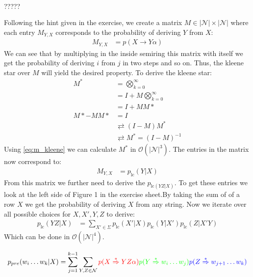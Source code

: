 \documentclass[a4paper,12pt]{ETHexercise}
\begin{document}
\begin{question}
\begin{subquestion}
\begin{align}
		\end{align}
		?????
	\end{subquestion}
	\begin{subquestion}
		Following the hint given in the exercise, we create a matrix $M \in |\mathcal{N}| \times |\mathcal{N}|$ where each entry $M_{Y,X}$ corresponds to the probability of deriving $Y$ from $X$:
		\begin{align}
			M_{Y,X} & = p(X \rightarrow Y\alpha)
		\end{align}
		We can see that by multiplying in the inside semiring this matrix with itself we get the probability of deriving $i$ from $j$ in two steps and so on. Thus, the kleene star over $M$ will yield the desired property. To derive the kleene star:
		\begin{align}
			M^*       & =\bigotimes_{k=0}^{\infty}                              \\
			          & =I + M \bigotimes_{k=0}^{\infty}                        \\
			          & = I + MM*                                               \\
			M*  - MM* & =I                                                      \\
			          & \rightleftarrows (I- M)M^*                              \\
			          & \rightleftarrows M^* = (I - M)^{-1} \label{eq:m_kleene}
		\end{align}
		Using \cref{eq:m_kleene} we can calculate $M^*$ in $\mathcal{O}(|\mathcal{N}|^3)$. The entries in the matrix now correspond to:
		\begin{align}
			M_{Y,X} & = p_{\text{lc}}(Y | X)
		\end{align}
		From this matrix we further need to derive the $p_{\text{lc}(YZ | X)}$. To get these entries we look at the left side of Figure 1 in the exercise sheet.By taking the sum of of a row $X$ we get the probability of deriving $X$ from any string. Now we iterate over all possible choices for $X, X',Y,Z$ to derive:
		\begin{align}
			p_{\text{lc}}(YZ | X) & = \sum_{X' \in \Sigma} p_{\text{lc}}(X' | X) p_{\text{lc}}(Y | X') p_{\text{lc}}(Z | X'Y) \label{eq:lc}
		\end{align}
		Which can be done in $\mathcal{O}(|\mathcal{N}|^4)$.
	\end{subquestion}
	\begin{subquestion}
		\begin{align}
			p_{pre}(w_i \dots w_k | X)                                    & = \sum_{j=1}^{k-1} \sum_{Y,Z \in \mathcal{N}} {\color{red} p(X \overset{*}{\Rightarrow} YZ\alpha)}{\color{green}p(Y \overset{*}{\Rightarrow} w_i \dots w_j)}{\color{blue} p(Z \overset{*}{\Rightarrow} w_{j+1} \dots w_k)} \label{eq:pre} \\

\end{align}
\end{subquestion}
\end{question}
\end{document}
